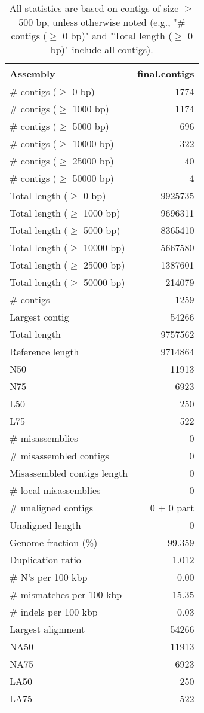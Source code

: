\documentclass[12pt,a4paper]{article}
\begin{document}
\begin{table}[ht]
\begin{center}
\caption{All statistics are based on contigs of size $\geq$ 500 bp, unless otherwise noted (e.g., "\# contigs ($\geq$ 0 bp)" and "Total length ($\geq$ 0 bp)" include all contigs).}
\begin{tabular}{|l*{1}{|r}|}
\hline
Assembly & final.contigs \\ \hline
\# contigs ($\geq$ 0 bp) & 1774 \\ \hline
\# contigs ($\geq$ 1000 bp) & 1174 \\ \hline
\# contigs ($\geq$ 5000 bp) & 696 \\ \hline
\# contigs ($\geq$ 10000 bp) & 322 \\ \hline
\# contigs ($\geq$ 25000 bp) & 40 \\ \hline
\# contigs ($\geq$ 50000 bp) & 4 \\ \hline
Total length ($\geq$ 0 bp) & 9925735 \\ \hline
Total length ($\geq$ 1000 bp) & 9696311 \\ \hline
Total length ($\geq$ 5000 bp) & 8365410 \\ \hline
Total length ($\geq$ 10000 bp) & 5667580 \\ \hline
Total length ($\geq$ 25000 bp) & 1387601 \\ \hline
Total length ($\geq$ 50000 bp) & 214079 \\ \hline
\# contigs & 1259 \\ \hline
Largest contig & 54266 \\ \hline
Total length & 9757562 \\ \hline
Reference length & 9714864 \\ \hline
N50 & 11913 \\ \hline
N75 & 6923 \\ \hline
L50 & 250 \\ \hline
L75 & 522 \\ \hline
\# misassemblies & 0 \\ \hline
\# misassembled contigs & 0 \\ \hline
Misassembled contigs length & 0 \\ \hline
\# local misassemblies & 0 \\ \hline
\# unaligned contigs & 0 + 0 part \\ \hline
Unaligned length & 0 \\ \hline
Genome fraction (\%) & 99.359 \\ \hline
Duplication ratio & 1.012 \\ \hline
\# N's per 100 kbp & 0.00 \\ \hline
\# mismatches per 100 kbp & 15.35 \\ \hline
\# indels per 100 kbp & 0.03 \\ \hline
Largest alignment & 54266 \\ \hline
NA50 & 11913 \\ \hline
NA75 & 6923 \\ \hline
LA50 & 250 \\ \hline
LA75 & 522 \\ \hline
\end{tabular}
\end{center}
\end{table}
\end{document}
